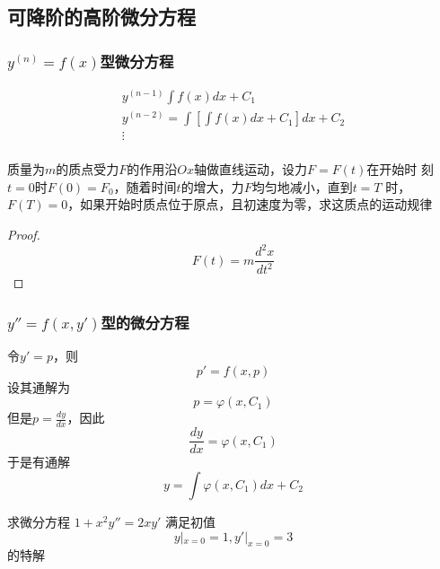 \documentclass[11pt]{article}
\begin{document}
\subsection{可降阶的高阶微分方程}
\label{sec:orga96f129}
\subsubsection{\(y^{(n)}=f(x)\)型微分方程}
\label{sec:org55e0ebf}
\begin{gather*}
y^{(n-1)}\int f(x)dx+C_1\\
y^{(n-2)}=\int[\int f(x)dx+C_1]dx+C_2\\
\vdots\\
\end{gather*}

\begin{proposition}[]
质量为\(m\)的质点受力\(F\)的作用沿\(Ox\)轴做直线运动，设力\(F=F(t)\)在开始时
刻\(t=0\)时\(F(0)=F_0\)，随着时间\(t\)的增大，力\(F\)均匀地减小，直到\(t=T\)
时，\(F(T)=0\)，如果开始时质点位于原点，且初速度为零，求这质点的运动规律
\end{proposition}

\begin{proof}
\begin{equation*}
F(t)=m\frac{d^2x}{dt^2}
\end{equation*}
\end{proof}
\subsubsection{\(y''=f(x,y')\)型的微分方程}
\label{sec:orgc9456a9}
令\(y'=p\)，则
\begin{equation*}
p'=f(x,p)
\end{equation*}
设其通解为
\begin{equation*}
p=\varphi(x,C_1)
\end{equation*}
但是\(p=\frac{dy}{dx}\)，因此
\begin{equation*}
\frac{dy}{dx}=\varphi(x,C_1)
\end{equation*}
于是有通解
\begin{equation*}
y=\int\varphi(x,C_1)dx+C_2
\end{equation*}

\begin{proposition}[]
求微分方程
\(1+x^2y''=2xy'\) 满足初值
\begin{equation*}
y|_{x=0}=1,y'|_{x=0}=3
\end{equation*}
的特解
\end{proposition}
\end{document}
